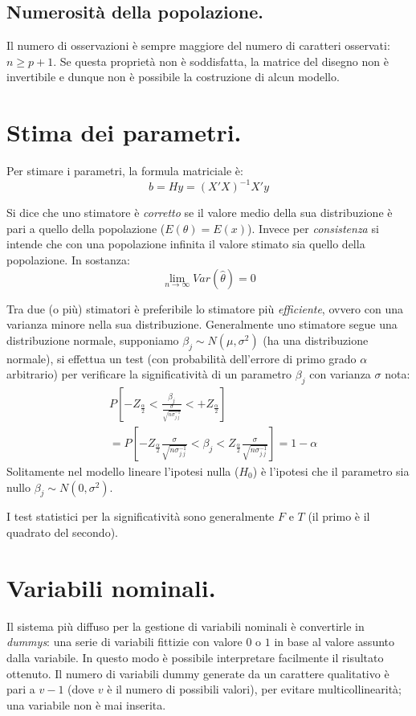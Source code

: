\documentclass[11pt, twocolumn]{article}
\begin{document}
\subsection*{Numerosità della popolazione.}
Il numero di osservazioni è sempre maggiore del numero di caratteri osservati: $n \geq p + 1$.
Se questa proprietà non è soddisfatta, la matrice del disegno non è invertibile e dunque non è possibile la costruzione di alcun modello.


\section{Stima dei parametri.}
Per stimare i parametri, la formula matriciale è:
\begin{equation*}
  b = Hy = (X'X)^{-1}X' y
\end{equation*}

Si dice che uno stimatore è \textit{corretto} se il valore medio della sua distribuzione è pari a quello della popolazione ($E(\theta) = E(x)$).
Invece per \textit{consistenza} si intende che con una popolazione infinita il valore stimato sia quello della popolazione.
In sostanza:
\begin{equation*}
  \lim_{n\to\infty} Var(\hat{\theta}) = 0
\end{equation*}

Tra due (o più) stimatori è preferibile lo stimatore più \textit{efficiente}, ovvero con una varianza minore nella sua distribuzione.
Generalmente uno stimatore segue una distribuzione normale, supponiamo $\beta_j \sim N(\mu,\sigma^2)$ (ha una distribuzione normale), si effettua un test (con probabilità dell'errore di primo grado $\alpha$ arbitrario) per verificare la significatività di un parametro $\beta_j$ con varianza $\sigma$ nota:
\begin{align*}
  &P[-Z_{\frac{\alpha}{2}} < \frac{\beta_j}{\frac{\sigma}{\sqrt{n\sigma^{-1}_{j.j}}}} < +Z_{\frac{\alpha}{2}}] \\
  &= P[-Z_{\frac{\alpha}{2}} \frac{\sigma}{\sqrt{n\sigma^{-1}_{j.j}}} < \beta_j < Z_{\frac{\alpha}{2}} \frac{\sigma}{\sqrt{n\sigma^{-1}_{j.j}}}] = 1 - \alpha
\end{align*}
Solitamente nel modello lineare l'ipotesi nulla ($H_0$) è l'ipotesi che il parametro sia nullo $\beta_j \sim N(0,\sigma^2)$.

I test statistici per la significatività sono generalmente $F$ e $T$ (il primo è il quadrato del secondo).

\section{Variabili nominali.}
Il sistema più diffuso per la gestione di variabili nominali è convertirle in \textit{dummys}: una serie di variabili fittizie con valore $0$ o $1$ in base al valore assunto dalla variabile.
In questo modo è possibile interpretare facilmente il risultato ottenuto.
Il numero di variabili dummy generate da un carattere qualitativo è pari a $v - 1$ (dove $v$ è il numero di possibili valori), per evitare multicollinearità; una variabile non è mai inserita.
\end{document}
